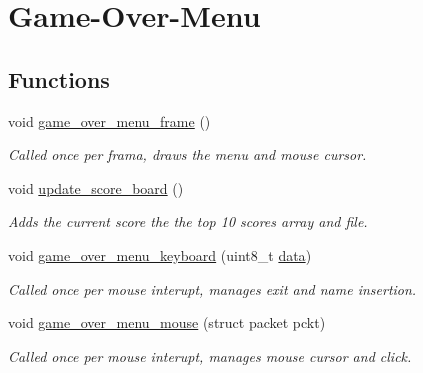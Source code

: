 \hypertarget{group__Game-Over-Menu}{}\section{Game-\/\+Over-\/\+Menu}
\label{group__Game-Over-Menu}
\subsection*{Functions}
\begin{DoxyCompactItemize}
\item 
void \hyperlink{group__Game-Over-Menu_ga8105461ec4f2f3dc83bf6b821b353144}{game\+\_\+over\+\_\+menu\+\_\+frame} ()
\begin{DoxyCompactList}\small\item\em Called once per frama, draws the menu and mouse cursor. \end{DoxyCompactList}\item 
void \hyperlink{group__Game-Over-Menu_gaacffded003ea0e055b93b3cf2bf26293}{update\+\_\+score\+\_\+board} ()
\begin{DoxyCompactList}\small\item\em Adds the current score the the top 10 scores array and file. \end{DoxyCompactList}\item 
void \hyperlink{group__Game-Over-Menu_ga8a878da05a37cf4c3e82b28282dc5c47}{game\+\_\+over\+\_\+menu\+\_\+keyboard} (uint8\+\_\+t \hyperlink{group__Proj_ga325819a8e492ac69542e8b31705af6e9}{data})
\begin{DoxyCompactList}\small\item\em Called once per mouse interupt, manages exit and name insertion. \end{DoxyCompactList}\item 
void \hyperlink{group__Game-Over-Menu_gae4cc6accba6062a3b5855bfc3826b215}{game\+\_\+over\+\_\+menu\+\_\+mouse} (struct packet pckt)
\begin{DoxyCompactList}\small\item\em Called once per mouse interupt, manages mouse cursor and click. \end{DoxyCompactList}\end{DoxyCompactItemize}
